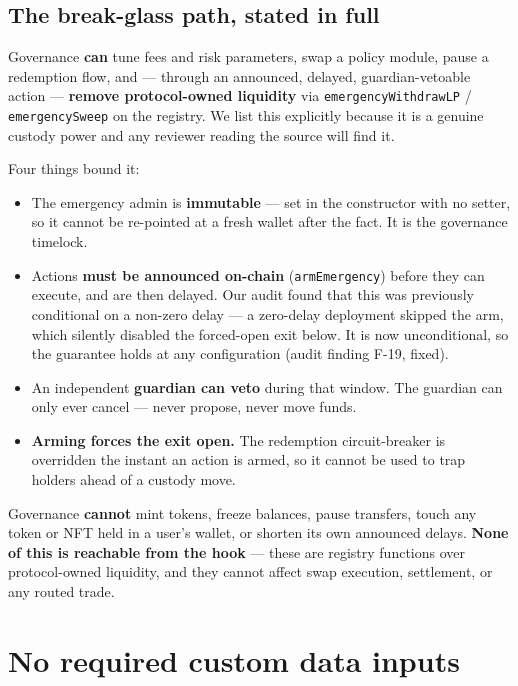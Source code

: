 \documentclass[11pt,a4paper]{article}
\newcommand{\code}[1]{\texttt{\small #1}}
\begin{document}
\subsection{The break-glass path, stated in full}

Governance \textbf{can} tune fees and risk parameters, swap a policy module, pause
a redemption flow, and --- through an announced, delayed, guardian-vetoable
action --- \textbf{remove protocol-owned liquidity} via
\code{emergencyWithdrawLP} / \code{emergencySweep} on the registry. We list this
explicitly because it is a genuine custody power and any reviewer reading the
source will find it.

Four things bound it:
\begin{itemize}
\item The emergency admin is \textbf{immutable} --- set in the constructor with
no setter, so it cannot be re-pointed at a fresh wallet after the fact. It is the
governance timelock.
\item Actions \textbf{must be announced on-chain} (\code{armEmergency}) before they
can execute, and are then delayed. Our audit found that this was previously
conditional on a non-zero delay --- a zero-delay deployment skipped the arm, which
silently disabled the forced-open exit below. It is now unconditional, so the
guarantee holds at any configuration (audit finding F-19, fixed).
\item An independent \textbf{guardian can veto} during that window. The guardian
can only ever cancel --- never propose, never move funds.
\item \textbf{Arming forces the exit open.} The redemption circuit-breaker is
overridden the instant an action is armed, so it cannot be used to trap holders
ahead of a custody move.
\end{itemize}

\noindent Governance \textbf{cannot} mint tokens, freeze balances, pause
transfers, touch any token or NFT held in a user's wallet, or shorten its own
announced delays. \textbf{None of this is reachable from the hook} --- these are
registry functions over protocol-owned liquidity, and they cannot affect swap
execution, settlement, or any routed trade.

\section{No required custom data inputs}
\label{sec:hookdata}
\end{document}
